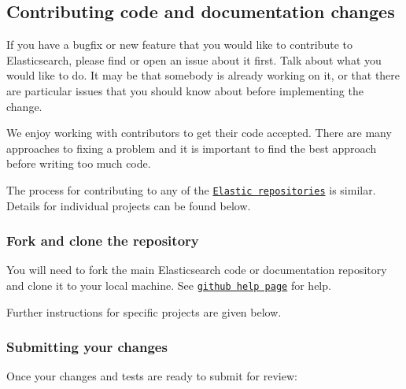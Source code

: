 \subsection*{Contributing code and documentation changes }

If you have a bugfix or new feature that you would like to contribute to Elasticsearch, please find or open an issue about it first. Talk about what you would like to do. It may be that somebody is already working on it, or that there are particular issues that you should know about before implementing the change.

We enjoy working with contributors to get their code accepted. There are many approaches to fixing a problem and it is important to find the best approach before writing too much code.

The process for contributing to any of the \href{https://github.com/elastic/}{\tt Elastic repositories} is similar. Details for individual projects can be found below.

\subsubsection*{Fork and clone the repository}

You will need to fork the main Elasticsearch code or documentation repository and clone it to your local machine. See \href{https://help.github.com/articles/fork-a-repo}{\tt github help page} for help.

Further instructions for specific projects are given below.

\subsubsection*{Submitting your changes}

Once your changes and tests are ready to submit for review\+:


